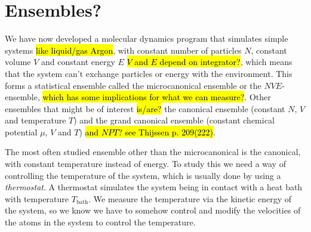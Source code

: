\chapter{Ensembles?}

We have now developed a molecular dynamics program that simulates simple systems \hl{like liquid/gas Argon}, with constant number of particles $N$, constant volume $V$ and constant energy $E$ \hl{$V$ and $E$ depend on integrator?}, which means that the system can't exchange particles or energy with the environment. This forms a statistical ensemble called the microcanonical ensemble or the $NVE$-ensemble, \hl{which has some implications for what we can measure?}. Other ensembles that might be of interest \hl{is/are?} the canonical ensemble (constant $N$, $V$ and temperature $T$) and the grand canonical ensemble (constant chemical potential $\mu$, $V$ and $T$) \hl{and $NPT$? see Thijssen p. 209(222)}.


The most often studied ensemble other than the microcanonical is the canonical, with constant temperature instead of energy. To study this we need a way of controlling the temperature of the system, which is usually done by using a \emph{thermostat}. A thermostat simulates the system being in contact with a heat bath with temperature $T_\text{bath}$.  We measure the temperature via the kinetic energy of the system, so we know we have to somehow control and modify the velocities of the atoms in the system to control the temperature. 


